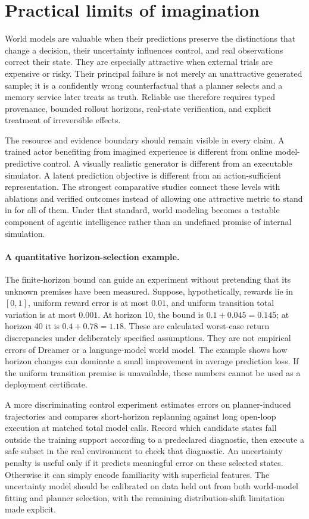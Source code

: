 \section{Practical limits of imagination}
\label{sec:C06:limits}
World models are valuable when their predictions preserve the distinctions that change a decision, their uncertainty influences control, and real observations correct their state. They are especially attractive when external trials are expensive or risky. Their principal failure is not merely an unattractive generated sample; it is a confidently wrong counterfactual that a planner selects and a memory service later treats as truth. Reliable use therefore requires typed provenance, bounded rollout horizons, real-state verification, and explicit treatment of irreversible effects.

The resource and evidence boundary should remain visible in every claim. A trained actor benefiting from imagined experience is different from online model-predictive control. A visually realistic generator is different from an executable simulator. A latent prediction objective is different from an action-sufficient representation. The strongest comparative studies connect these levels with ablations and verified outcomes instead of allowing one attractive metric to stand in for all of them. Under that standard, world modeling becomes a testable component of agentic intelligence rather than an undefined promise of internal simulation.

\paragraph{A quantitative horizon-selection example.}
The finite-horizon bound can guide an experiment without pretending that its unknown premises have been measured. Suppose, hypothetically, rewards lie in $[0,1]$, uniform reward error is at most $0.01$, and uniform transition total variation is at most $0.001$. At horizon 10, the bound is $0.1+0.045=0.145$; at horizon 40 it is $0.4+0.78=1.18$. These are calculated worst-case return discrepancies under deliberately specified assumptions. They are not empirical errors of Dreamer or a language-model world model. The example shows how horizon changes can dominate a small improvement in average prediction loss. If the uniform transition premise is unavailable, these numbers cannot be used as a deployment certificate.

A more discriminating control experiment estimates errors on planner-induced trajectories and compares short-horizon replanning against long open-loop execution at matched total model calls. Record which candidate states fall outside the training support according to a predeclared diagnostic, then execute a safe subset in the real environment to check that diagnostic. An uncertainty penalty is useful only if it predicts meaningful error on these selected states. Otherwise it can simply encode familiarity with superficial features. The uncertainty model should be calibrated on data held out from both world-model fitting and planner selection, with the remaining distribution-shift limitation made explicit.


